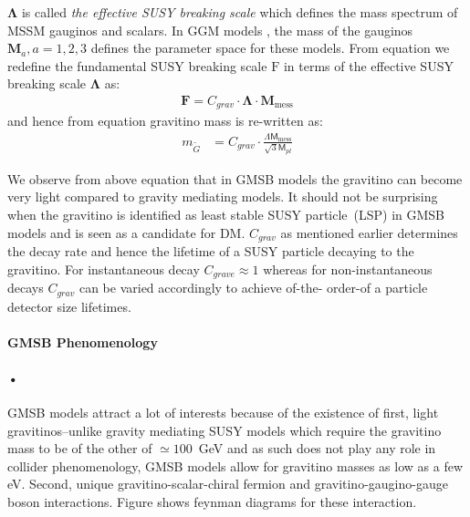 {$\mathbf{\Lambda}$ is called \textit{the effective SUSY breaking scale} which defines the mass spectrum of MSSM gauginos and scalars.
In GGM models \cite{MDINE,MDINE1,MDINE2}, the mass of the gauginos $\mathbf{M}_{a}, a=1,2,3$ defines the parameter space for these models.
From equation \label{lt} we redefine the fundamental SUSY breaking scale $\mathrm{F}$ in terms of the effective SUSY breaking scale $\mathbf{\Lambda}$ as:
\begin{align}\label{scale}
\mathbf{F} = C_{grav}\cdot \mathbf{\Lambda}\cdot\mathbf{M}_{\mbox{mess}} 
\end{align}
and hence from equation \label{ } gravitino mass is re-written as:
\begin{align}\label{gmass}
m_{\tilde{G}} &= C_{grav}\cdot \frac{\Lambda\mathsf{M}_{\mbox{mess}}}{\sqrt{3}\mathsf{M}_{pl}}
\end{align}

We observe from above equation that in GMSB models the gravitino can become very light compared to gravity mediating models. It should not be surprising when the gravitino is identified as least stable SUSY particle~(LSP) in GMSB models and is seen as a candidate for DM. $C_{grav}$ as mentioned earlier determines the decay rate and hence the lifetime of a SUSY particle decaying to the gravitino. For instantaneous decay $C_{grave} \approx 1$ whereas for non-instantaneous decays $C_{grav}$ can be varied accordingly to achieve of-the- order-of a particle detector size lifetimes.
\paragraph{GMSB Phenomenology}
\paragraph*{•}
GMSB models attract a lot of interests  because of the existence of first, light gravitinos--unlike gravity mediating SUSY models which require the gravitino mass to be of the other of $\simeq 100$~GeV and as such does not play any role in collider phenomenology, GMSB models allow for gravitino masses as low as a few eV.
Second, unique gravitino-scalar-chiral fermion and gravitino-gaugino-gauge boson interactions. Figure\label{gravitino} shows feynman diagrams for these interaction.

}
